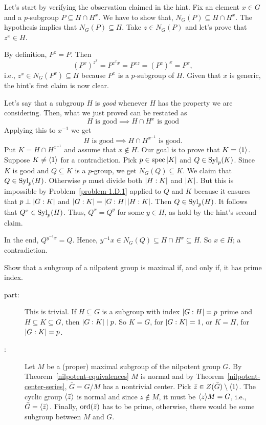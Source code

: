 \begin{solution} Let's start by verifying the observation claimed in the hint. Fix an element $x\in G$ and a $p$-subgroup $P\subseteq H\cap H^x$. We have to show that, $N_G(P)\subseteq H\cap H^x$. The hypothesis implies that $N_G(P)\subseteq H$. Take $z\in N_G(P)$ and let's prove that $z^x\in H$.

By definition, $P^z=P$. Then
$$
    (P^x)^{z^x} = P^{z^xx} = P^{xz} = (P^z)^x = P^x,
$$
i.e., $z^x\in N_G(P^x)\subseteq H$ because $P^x$ is a $p$-subgroup of $H$. Given that $x$ is generic, the hint's first claim is now clear.

Let's say that a subgroup $H$ is \textsl{good\/} whenever $H$ has the property we are considering. Then, what we just proved can be restated as
$$
    H \text{ is good} \implies H\cap H^x\text{ is good}
$$
Applying this to $x^{-1}$ we get
$$
    H \text{ is good} \implies H\cap H^{x^{-1}}\text{ is good}.
$$
Put $K=H\cap H^{x^{-1}}$ and assume that $x\notin H$. Our goal is to prove that $K=\langle1\rangle$. Suppose $K\ne\langle1\rangle$ for a contradiction. Pick $p\in\operatorname{spec}\left\vert{K}\right\vert$ and $Q\in{\rm Syl}_p(K)$. Since $K$ is good and $Q\subseteq K$ is a $p$-group, we get $N_G(Q)\subseteq K$. We claim that $Q\in{\rm Syl}_p(H)$. Otherwise $p$ must divide both $\left\vert{H:K}\right\vert$ and $\left\vert{K}\right\vert$. But this is impossible by Problem~\ref{problem-1.D.1} applied to $Q$ and $K$ because it ensures that $p\perp\left\vert{G:K}\right\vert$ and $\left\vert{G:K}\right\vert=\left\vert{G:H}\right\vert\left\vert{H:K}\right\vert$. Then $Q\in{\rm Syl}_p(H)$. It follows that $Q^x\in{\rm Syl}_p(H)$. Thus, $Q^x=Q^y$ for some $y\in H$, as hold by the hint's second claim.

In the end, $Q^{y^{-1}x}=Q$. Hence, $y^{-1}x\in N_G(Q)\subseteq H\cap H^x\subseteq H$. So $x\in H$; a contradiction.  \end{solution}

\begin{probl}\label{problem-1.D.6}
    Show that a subgroup of a nilpotent group is maximal if, and only if, it has prime index.
\end{probl}

\begin{solution}

\begin{description}%
    \item[ part:] This is trivial. If $H\subseteq G$ is a subgroup with index $\left\vert{G:H}\right\vert=p$ prime and $H\subseteq K\subseteq G$, then $\left\vert{G:K}\right\vert\mid p$. So $K=G$, for $\left\vert{G:K}\right\vert=1$, or $K=H$, for $\left\vert{G:K}\right\vert=p$.
    
    \item[:] Let $M$ be a (proper) maximal subgroup of the nilpotent group $G$. By Theorem~\ref{nilpotent-equivalences} $M$ is normal and by Theorem~\ref{nilpotent-center-series}, $\bar G=G/M$ has a nontrivial center. Pick $\bar z\in Z(\bar G)\setminus\langle1\rangle$. The cyclic group $\langle\bar z\rangle$ is normal and since $z\notin M$, it must be $\langle z\rangle M=G$, i.e., $\bar G=\langle\bar z\rangle$. Finally, ${\rm ord}(\bar z)$ has to be prime, otherwise, there would be some subgroup between $M$ and $G$.
\end{description}
\end{solution}

